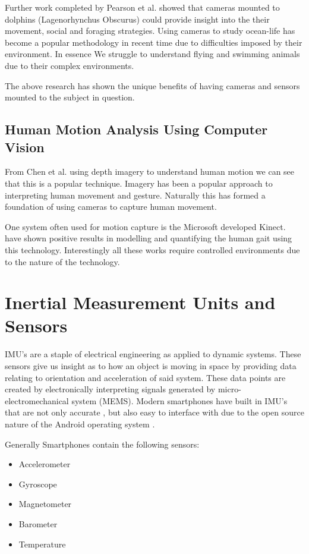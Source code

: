 Further work completed by Pearson et al. \cite{pearson2017testing} showed that cameras mounted to dolphins (Lagenorhynchus Obscurus) could provide insight into the their movement, social and foraging strategies. Using cameras to study ocean-life has become a popular methodology in recent time due to difficulties imposed by their environment. In essence We struggle to understand flying and swimming animals due to their complex environments.

The above research has shown the unique benefits of having cameras and sensors mounted to the subject in question. 

\subsection{Human Motion Analysis Using Computer Vision}
From Chen et al.\cite{chen2013survey} using depth imagery to understand human motion we can see that this is a popular technique. Imagery has been a popular approach to interpreting human movement and gesture. Naturally this has formed a foundation of using cameras to capture human movement.

One system often used for motion capture is the Microsoft developed Kinect. \cite{gabel2012full} \cite{stone2013unobtrusive} \cite{clark2013concurrent} have shown positive results in modelling and quantifying the human gait using this technology. Interestingly all these works require controlled environments due to the nature of the technology. 

\section{Inertial Measurement Units and Sensors}
IMU's are a staple of electrical engineering as applied to dynamic systems. These sensors give us insight as to how an object is moving in space by providing data relating to orientation and acceleration of said system. These data points are created by electronically interpreting signals generated by micro-electromechanical system (MEMS). Modern smartphones have built in IMU's that are not only accurate \cite{gikas2016rigorous}, but also easy to interface with due to the open source nature of the Android operating system \cite{androidSensorLib}.  

Generally Smartphones contain the following sensors:
\begin{itemize}
\item Accelerometer
\item Gyroscope
\item Magnetometer
\item Barometer
\item Temperature
\end{itemize}

